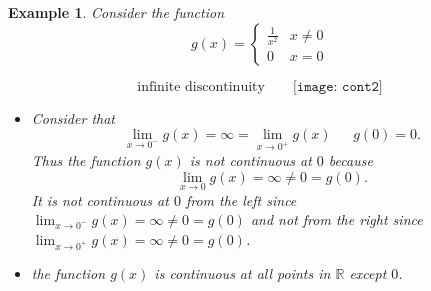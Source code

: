 \documentclass[12pt,a4paper]{book}
\newtheorem{Example}[theorem]{Example}
\numberwithin{equation}{section}
\begin{document}
\begin{tcolorbox}[width=\textwidth,colback={green!20},title={},colbacktitle=yellow,coltitle=blue] 
\begin{Example}
				Consider the function 
	$$g(x)=\begin{cases}
	\frac{1}{x^2} & x\neq 0\\
	0 & x=0
	\end{cases}$$
\begin{mdframed}
	$$\text{infinite discontinuity}\quad \quad 
	\texttt{[image: cont2]}
	$$
\end{mdframed}
\begin{itemize}
	\item Consider that 
	$$ \lim_{x\to 0^{-}}g(x)=\infty=\lim_{x\to 0^{+}}g(x)~~~~~~~g(0)=0.$$
Thus 	the function $g(x)$ is not continuous at $0$ 
because  $$\lim_{x\to 0}g(x)=\infty\neq 0=g(0).$$
It is not continuous at $0$ from the left since $\lim_{x\to 0^{-}}g(x)=\infty\neq 0=g(0)$ and not from  the right since $\lim_{x\to 0^{+}}g(x)=\infty\neq 0=g(0)$.
	\item the function $g(x)$ is continuous at all points in $\mathbb{R}$ except $0$. 
\end{itemize}

\end{Example}
\end{tcolorbox}
\end{document}
